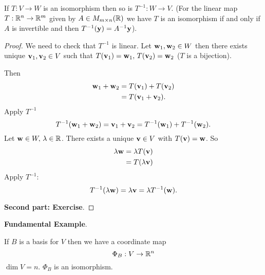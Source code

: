 \documentclass[10pt, a4paper]{article}
\begin{document}
\begin{lemma}
    If $T : V \rightarrow W$ is an isomorphism then so is $T ^ {-1} : W \rightarrow V$.
    (For the linear map $T : \mathbb{R} ^ n \rightarrow \mathbb{R} ^ m$ given by $A \in M_{m \times n}(\mathbb{R})$ we have $T$ is an isomorphism if and only if $A$ is invertible and then $T ^ {-1}(\mathbf{y}) = A ^ {-1}\mathbf{y}$).
    \begin{proof}
        We need to check that $T ^ {-1}$ is linear.
        Let $\mathbf{w}_1, \mathbf{w}_2 \in W$ then there exists unique $\mathbf{v}_1, \mathbf{v}_2 \in V$ such that $T(\mathbf{v}_1) = \mathbf{w}_1,\, T(\mathbf{v}_2) = \mathbf{w}_2$
        ($T$ is a bijection).

        Then
        \begin{align*}
            \mathbf{w}_1 + \mathbf{w}_2 &= T(\mathbf{v}_1) + T(\mathbf{v}_2) \\
            &= T(\mathbf{v}_1 + \mathbf{v}_2).
        \end{align*}
        Apply $T ^ {-1}$
        \[
        T ^ {-1}(\mathbf{w}_1 + \mathbf{w}_2) = \mathbf{v}_1 + \mathbf{v}_2 = T ^ {-1}(\mathbf{w}_1) + T ^ {-1}(\mathbf{w}_2).
        \]
        Let $\mathbf{w} \in W,\, \lambda \in \mathbb{R}$.
        There exists a unique $\mathbf{v} \in V$ with $T(\mathbf{v}) = \mathbf{w}$.
        So
        \begin{align*}
            \lambda\mathbf{w} &= \lambda T(\mathbf{v}) \\
            &= T(\lambda\mathbf{v})
        \end{align*}
        Apply $T ^ {-1}$:
        \[
        T ^ {-1}(\lambda\mathbf{w}) = \lambda\mathbf{v} = \lambda T ^ {-1}(\mathbf{w}).
        \]
        
        
        \textbf{Second part: Exercise}.
    \end{proof}
\end{lemma}

\textbf{Fundamental Example}.

If $B$ is a basis for $V$ then we have a coordinate map
\[
\Phi_B : V \rightarrow \mathbb{R} ^ n
\]
$\dim{V} = n$.
$\Phi_B$ is an isomorphism.
\end{document}

